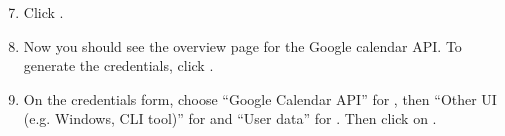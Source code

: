 \documentclass[letterpaper,10pt,english]{sphinxmanual}
\begin{document}
\begin{DUlineblock}{0em}
\item[] 
\end{DUlineblock}
\begin{enumerate}
\setcounter{enumi}{6}
\item {} 
Click .

\end{enumerate}

\begin{figure}[h!]
\centering
{}\end{figure}

\begin{DUlineblock}{0em}
\item[] 
\end{DUlineblock}
\begin{enumerate}
\setcounter{enumi}{7}
\item {} 
Now you should see the overview page for the Google calendar API.
To generate the credentials, click .

\end{enumerate}

\begin{figure}[h!]
\centering
{}\end{figure}

\begin{DUlineblock}{0em}
\item[] 
\end{DUlineblock}
\begin{enumerate}
\setcounter{enumi}{8}
\item {} 
On the credentials form, choose “Google Calendar API” for ,
then “Other UI (e.g. Windows, CLI tool)” for 
and “User data” for . Then click on .

\end{enumerate}

\begin{figure}[h!]
\centering
{}\end{figure}
\end{document}
